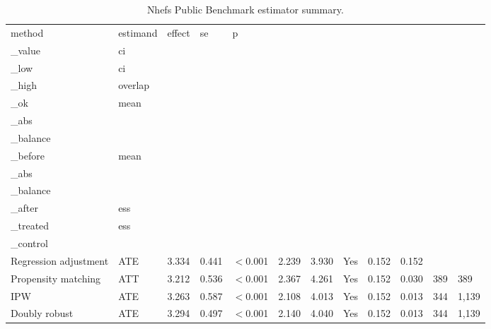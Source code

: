 \begin{table}[t!]
\centering
\small
\caption{Nhefs Public Benchmark estimator summary.}
\label{tab:nhefs_public_benchmark-estimators}
\setlength{\tabcolsep}{4.5pt}
\begin{tabular}{llllllllllll}
\hline
method & estimand & effect & se & p\\_value & ci\\_low & ci\\_high & overlap\\_ok & mean\\_abs\\_balance\\_before & mean\\_abs\\_balance\\_after & ess\\_treated & ess\\_control \\
\hline
Regression adjustment & ATE & 3.334 & 0.441 & $<$0.001 & 2.239 & 3.930 & Yes & 0.152 & 0.152 &  &  \\
Propensity matching & ATT & 3.212 & 0.536 & $<$0.001 & 2.367 & 4.261 & Yes & 0.152 & 0.030 & 389 & 389 \\
IPW & ATE & 3.263 & 0.587 & $<$0.001 & 2.108 & 4.013 & Yes & 0.152 & 0.013 & 344 & 1,139 \\
Doubly robust & ATE & 3.294 & 0.497 & $<$0.001 & 2.140 & 4.040 & Yes & 0.152 & 0.013 & 344 & 1,139 \\
\hline
\end{tabular}
\end{table}

